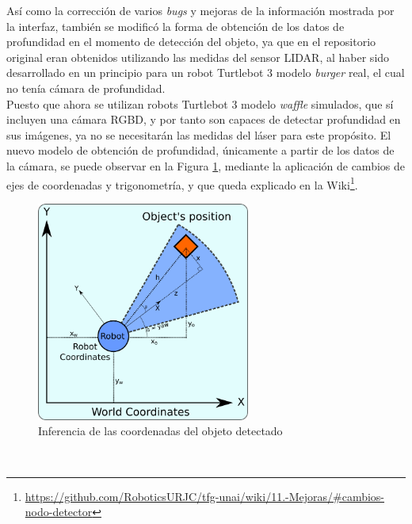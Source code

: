 Así como la corrección de varios \textit{bugs} y mejoras de la información
mostrada por la interfaz, también se modificó la forma de obtención de los datos
de profundidad en el momento de detección del objeto, ya que en el repositorio
original eran obtenidos utilizando las medidas del sensor LIDAR, al haber sido
desarrollado en un principio para un robot Turtlebot 3 modelo \textit{burger}
real, el cual no tenía cámara de profundidad.
\\

Puesto que ahora se utilizan robots Turtlebot 3 modelo \textit{waffle}
simulados, que sí incluyen una cámara RGBD, y por tanto son capaces de detectar
profundidad en sus imágenes, ya no se necesitarán las medidas del láser para
este propósito.
El nuevo modelo de obtención de profundidad, únicamente a partir de los datos de
la cámara, se puede observar en la Figura \ref{fig:coords_infer}, mediante la
aplicación de cambios de ejes de coordenadas y trigonometría, y que queda
explicado en la Wiki\footnote{
\href{https://github.com/RoboticsURJC/tfg-unai/wiki/11.-Mejoras-y-correcciones-del-swarm\_obj\_finder-\%5B30-Sep-\%E2\%80\%90-9-Nov\%5D\#cambios-del-nodo-detector-de-objetos}{https://github.com/RoboticsURJC/tfg-unai/wiki/11.-Mejoras/\#cambios-nodo-detector}}.
\\

\begin{figure} [h!]
  \begin{center}
    \includegraphics[width=7cm]{figs/coordinates_scheme}
  \end{center}
  \caption{Inferencia de las coordenadas del objeto detectado}
  \label{fig:coords_infer}
\end{figure}\

